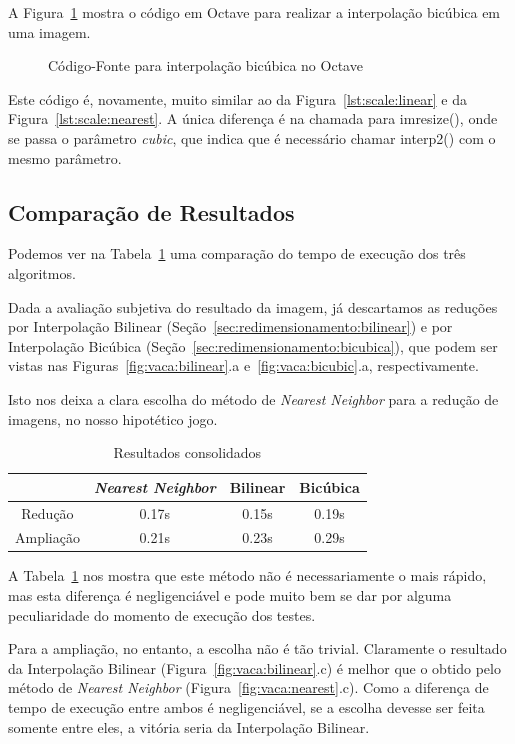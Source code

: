 \documentclass[12pt]{article}
\begin{document}
A Figura~\ref{lst:scale:cubic} mostra o código em Octave para realizar a interpolação bicúbica em uma imagem.

\begin{figure}[H]

\caption{Código-Fonte para interpolação bicúbica no Octave}
\label{lst:scale:cubic}
\end{figure}

Este código é, novamente, muito similar ao da Figura~\ref{lst:scale:linear} e da Figura~\ref{lst:scale:nearest}. A única diferen\c{c}a é na chamada para \textsf{imresize()}, onde se passa o parâmetro \emph{cubic}, que indica que é necessário chamar \textsf{interp2()} com o mesmo parâmetro.

\subsection{Comparação de Resultados}\label{sec:redimensionamento:comparacao}

Podemos ver na Tabela~\ref{tab:scale:resultados} uma comparação do tempo de execução dos três algoritmos.

Dada a avaliação subjetiva do resultado da imagem, já descartamos as redu\c{c}ões por Interpolação Bilinear (Seção~\ref{sec:redimensionamento:bilinear}) e por Interpolação Bicúbica (Seção~\ref{sec:redimensionamento:bicubica}), que podem ser vistas nas Figuras~\ref{fig:vaca:bilinear}.a e~\ref{fig:vaca:bicubic}.a, respectivamente.

Isto nos deixa a clara escolha do método de \textit{Nearest Neighbor} para a redução de imagens, no nosso hipotético jogo.

\begin{table}[H]
  \centering
  \begin{tabular}[H]{c || c | c | c}
   & \textit{Nearest Neighbor} & Bilinear & Bicúbica \\
    \hline
   Redução & 0.17s & 0.15s & 0.19s \\
   Ampliação & 0.21s & 0.23s & 0.29s
  \end{tabular}
  \caption{Resultados consolidados}
  \label{tab:scale:resultados}
\end{table}

A Tabela~\ref{tab:scale:resultados} nos mostra que este método não é necessariamente o mais rápido, mas esta diferen\c{c}a é negligenciável e pode muito bem se dar por alguma peculiaridade do momento de execução dos testes.

Para a ampliação, no entanto, a escolha não é tão trivial. Claramente o resultado da Interpolação Bilinear (Figura~\ref{fig:vaca:bilinear}.c) é melhor que o obtido pelo método de \textit{Nearest Neighbor} (Figura~\ref{fig:vaca:nearest}.c). Como a diferen\c{c}a de tempo de execução entre ambos é negligenciável, se a escolha devesse ser feita somente entre eles, a vitória seria da Interpolação Bilinear.
\end{document}
